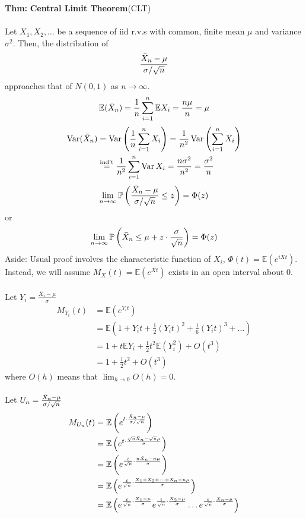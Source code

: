 \documentclass[a4paper]{article}
\newcommand{\n}{\hfill\break}
\newcommand{\thm}[1]{\par\noindent\settowidth{\hangindent}{\textbf{Thm: }}\textbf{Thm: }#1\n}
\newcommand{\Prob}{\mathbb{P}}
\renewcommand{\P}{\Prob}
\newcommand{\Avg}{\mathbb{E}}
\newcommand{\E}{\Avg}
\DeclareMathOperator{\Var}{Var}
\begin{document}
\thm{
    \textbf{Central Limit Theorem}(CLT)
    \\\\
    Let $X_1, X_2,\dots$ be a sequence of iid r.v.s with common, finite mean $\mu$ and variance $\sigma^2$. Then, the distribution of
    \[\frac{\Bar{X}_n-\mu}{\sigma/\sqrt{n}}\]
    approaches that of $N(0,1)$ as $n\rightarrow\infty$.
    \[\E(\Bar{X}_n)=\frac{1}{n}\sum^n_{i=1}\E X_i=\frac{n\mu}{n}=\mu\]
    \begin{align*}
        \Var(\Bar{X}_n)&=\Var\left(\frac{1}{n}\sum^n_{i=1}X_i\right)=\frac{1}{n^2}\Var\left(\sum^n_{i=1}X_i\right) \\
        &\overset{\text{ind't}}{=}\frac{1}{n^2}\sum^n_{i=1}\Var X_i=\frac{n\sigma^2}{n^2}=\frac{\sigma^2}{n}
    \end{align*}
    \[\lim_{n\rightarrow\infty}\P\left(\frac{\Bar{X}_n-\mu}{\sigma/\sqrt{n}}\leq z\right)=\Phi(z)\]
    or
    \[\lim_{n\rightarrow\infty}\P\left(\Bar{X}_n\leq \mu+z\cdot\frac{\sigma}{\sqrt{n}}\right)=\Phi(z)\]
    Aside: Usual proof involves the characteristic function of $X_i$, $\Phi(t)=\E(e^{iXt})$. Instead, we will assume $M_X(t)=\E(e^{Xt})$ exists in an open interval about 0.
    \\\\
    Let $Y_i=\frac{X_i-\mu}{\sigma}$
    \begin{align*}
        M_{Y_i}(t)&=\E(e^{Y_it}) \\
        &=\E(1+Y_it+\frac{1}{2}(Y_it)^2+\frac{1}{6}(Y_it)^3+\dots) \\
        &=1+t\E Y_i+\frac{1}{2}t^2\E(Y_i^2)+O(t^3) \\
        &=1+\frac{1}{2}t^2+O(t^3)
    \end{align*}
    where $O(h)$ means that $\lim_{h\rightarrow0}O(h)=0$.
    \\\\
    Let $U_n=\frac{\Bar{X}_n-\mu}{\sigma/\sqrt{n}}$
    \begin{align*}
        M_{U_n}(t)&=\E\left(e^{t\cdot\frac{\Bar{X}_n-\mu}{\sigma/\sqrt{n}}}\right) \\
        &=\E\left(e^{t\cdot\frac{\sqrt{n}\Bar{X}_n-\sqrt{n}\mu}{\sigma}}\right) \\
        &=\E\left(e^{\frac{t}{\sqrt{n}}\cdot\frac{n\Bar{X}_n-n\mu}{\sigma}}\right) \\
        &=\E\left(e^{\frac{t}{\sqrt{n}}\cdot\frac{X_1+X_2+\dots+X_n-n\mu}{\sigma}}\right) \\
        &=\E\left(e^{\frac{t}{\sqrt{n}}\cdot\frac{X_1-\mu}{\sigma}}e^{\frac{t}{\sqrt{n}}\cdot\frac{X_2-\mu}{\sigma}}\dots e^{\frac{t}{\sqrt{n}}\cdot\frac{X_n-\mu}{\sigma}}\right) \\

\end{align*}}
\end{document}
